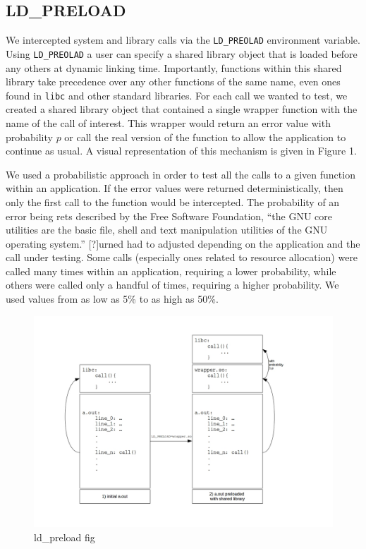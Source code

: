 \documentclass[10pt]{article}
\begin{document}
\subsection{LD\_PRELOAD} \label{ld_preload}
We intercepted system and library calls via the \texttt{LD\_PREOLAD} environment variable. Using \texttt{LD\_PREOLAD} a user can specify a shared library object that is loaded before any others at dynamic linking time. Importantly, functions within this shared library take precedence over any other functions of the same name, even ones found in \texttt{libc} and other standard libraries. For each call we wanted to test, we created a shared library object that contained a single wrapper function with the name of the call of interest. This wrapper would return an error value with probability $p$ or call the real version of the function to allow the application to continue as usual. A visual representation of this mechanism is given in Figure 1.

We used a probabilistic approach in order to test all the calls to a given function within an application. If the error values were returned deterministically, then only the first call to the function would be intercepted. The probability of an error being rets described by the Free Software Foundation, “the GNU core utilities are the basic file, shell and text manipulation utilities of the GNU operating system.” [?]urned had to adjusted depending on the application and the call under testing. Some calls (especially ones related to resource allocation) were called many times within an application, requiring a lower probability, while others were called only a handful of times, requiring a higher probability. We used values from as low as 5\% to as high as 50\%.

\begin{figure}
	\caption{ld\_preload fig}
	\includegraphics[width=\textwidth]{ldpreload_fig.jpg}
\end{figure}
\end{document}
